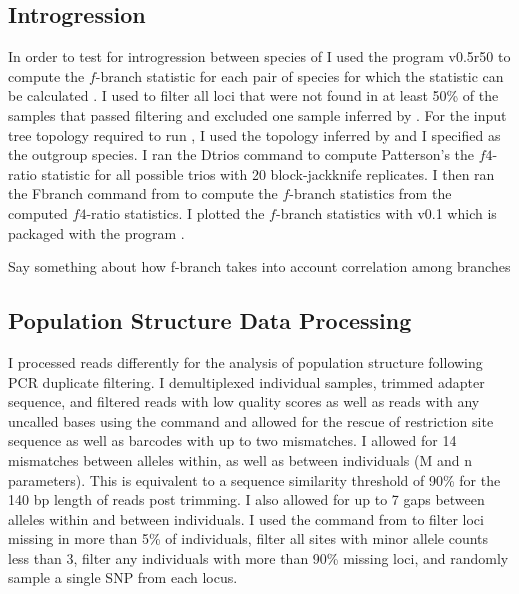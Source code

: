 \subsection{Introgression}
In order to test for introgression between species of \anaxyrus I used the 
program \dsuite v0.5r50 \parencite{malinsky2021} to compute the $f$-branch 
statistic for each pair of \anaxyrus species for which the statistic 
can be calculated \parencite{reich2009,malinsky2018}. 
I used \pyrad to filter all loci that were not found in at least 50\% of the 
samples that passed filtering and excluded one \fowl sample 
inferred by \iqtree.
For the input tree topology required to run \dsuite, I used the topology inferred
by \phycoeval and I specified \nebulifer as the outgroup species.
I ran the \dsuite Dtrios command to compute Patterson's the $f4$-ratio
statistic for all possible trios with 20 block-jackknife replicates.
I then ran the Fbranch command from \dsuite to compute the $f$-branch statistics 
from the computed $f4$-ratio statistics. 
I plotted the $f$-branch statistics with \dtools v0.1 which is packaged with
the \dsuite program \parencite{malinsky2021}. 

Say something about how f-branch takes into account correlation among branches

\subsection{Population Structure Data Processing}
I processed reads differently for the analysis of population structure
following PCR duplicate filtering. 
I demultiplexed individual samples, trimmed adapter sequence, and filtered 
reads with low quality scores as well as reads with any uncalled bases using the 
\processradtags command and allowed for the rescue of restriction site sequence 
as well as barcodes with up to two mismatches.  
I allowed for 14 mismatches between alleles within, as well as between individuals
(M and n parameters). This is equivalent to a sequence similarity threshold of   
90\% for the 140 bp length of reads post trimming. 
I also allowed for up to 7 gaps between alleles within and between individuals.
I used the \populations command from \stacks to filter loci missing in more than   
5\% of individuals, filter all sites with minor allele counts less than 3, filter 
any individuals with more than 90\% missing loci, and randomly sample a single
SNP from each locus.

